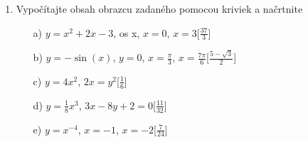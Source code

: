 \begin{enumerate}
\begin{enumerate}
\item[a)]{$\int \limits_0^1x\arctan(x)\,dx$}\hspace{\fill}[$\frac{\pi}{4}-\frac{1}{2}$]
\item[b)]{$\int \limits_1^9\frac{1}{1+\sqrt{x}}\,dx$}\hspace{\fill}[$4-2\ln(2)$]
\item[c)]{$\int \limits_0^{\frac{\pi}{2}}\sin^3(x)\cos^2(x)\,dx$}\hspace{\fill}[$\frac{1}{3}-\frac{1}{5}$]

\item[d)]{$\int \limits_0^1\frac{e^{x}}{1+e^{x}}\,dx$}\hspace{\fill}[$\ln(\frac{1 + e}{2})$]
\item[e)]{$\int \limits_{\frac{\pi}{6}}^{\frac{\pi}{3}}\frac{\sin(2x)}{\cos(x)}\,dx$}\hspace{\fill}[$\sqrt{3} - 1$]
\item[f)]{$\int \limits_0^2 |1-x|\,dx$}\hspace{\fill}[$1$]
\item[g)]{$\int \limits_{-1}^{1}\frac{dx}{x}$}\hspace{\fill}[Nelze použít formule, funkce nesplňuje předpoklady v $x=0$]
\end{enumerate}

\item Vypočítajte obsah obrazcu zadaného pomocou kriviek a načrtnite

\begin{enumerate}
\item[a)]{$y=x^2+2x-3$, os x, $x=0$, $x=3$}\hspace{\fill}[$\frac{37}{3}$]
\item[b)]{$y=-\sin(x)$, $y=0$, $x=\frac{\pi}{3}$, $x=\frac{7 \pi}{6}$}\hspace{\fill}[$\frac{5-\sqrt{3}}{2}$]
\item[c)]{$y=4x^2$, $2x=y^2$}\hspace{\fill}[$\frac{1}{6}$]
\item[d)]{$y=\frac{1}{8}x^3$, $3x-8y+2=0$}\hspace{\fill}[$\frac{11}{32}$]
\item[e)]{$y=x^{-4}$, $x=-1$, $x=-2$}\hspace{\fill}[$\frac{7}{24}$]


\end{enumerate}
\end{enumerate}

